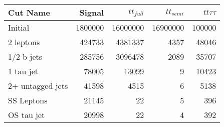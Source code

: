 \begin{tabular}{lrrrr}
\toprule
         Cut Name &   Signal &  $tt_{full}$ &  $tt_{semi}$ &  $tt\tau\tau$ \\
\midrule
          Initial &  1800000 &     16000000 &     16900000 &        100000 \\
        2 leptons &   424733 &      4381337 &         4357 &         48046 \\
       1/2 b-jets &   285756 &      3096478 &         2089 &         35707 \\
        1 tau jet &    78005 &        13099 &            9 &         10423 \\
 2+ untagged jets &    41598 &         4515 &            6 &          5138 \\
       SS Leptons &    21145 &           22 &            5 &           396 \\
       OS tau jet &    20998 &           22 &            4 &           392 \\
\bottomrule
\end{tabular}
